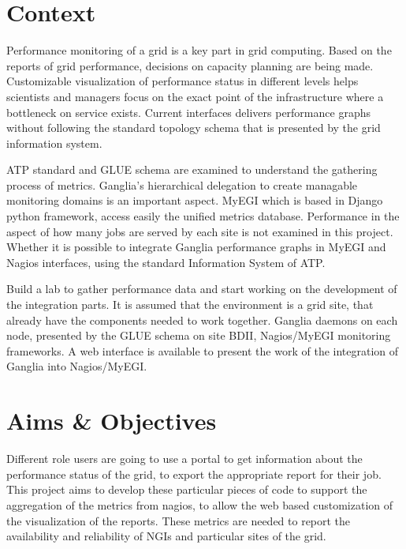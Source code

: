 \section{Context}

Performance monitoring of a grid is a key part in grid computing. Based on the
reports of grid performance, decisions on capacity planning are being made.
Customizable visualization of performance status in different levels helps
scientists and managers focus on the exact point of the infrastructure where a
bottleneck on service exists.
Current interfaces delivers performance graphs without following the standard
topology schema that is presented by the grid information system.

ATP standard and GLUE schema are examined to understand the gathering process of
metrics. Ganglia's hierarchical delegation to create managable monitoring
domains is an important aspect. MyEGI which is based in Django python
framework, access easily the unified metrics database. 
Performance in the aspect of how many jobs are served by each site is not
examined in this project.
Whether it is possible to integrate Ganglia performance graphs in MyEGI
and Nagios interfaces, using the standard Information System of ATP.

Build a lab to gather performance data and start working on the development of
the integration parts.
It is assumed that the environment is a grid site, that already have the
components needed to work together. Ganglia daemons on each node, presented by
the GLUE schema on site BDII, Nagios/MyEGI monitoring frameworks.
A web interface is available to present the work of the integration of Ganglia
into Nagios/MyEGI.


\section{Aims \& Objectives}

Different role users are going to use a portal to get information about the
performance status of the grid, to export the appropriate report for their job.
This project aims to develop these particular pieces of code to support the 
aggregation of the metrics from nagios, to allow the web based customization of
the visualization of the reports. These metrics are needed to report the
availability and reliability of NGIs and particular sites of the grid.

